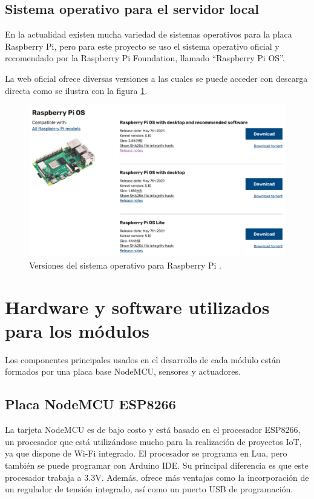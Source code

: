 \subsection{Sistema operativo para el servidor local}

En la actualidad existen mucha variedad de sistemas operativos para la placa Raspberry Pi, pero para este proyecto se uso el sistema operativo oficial y recomendado por la Raspberry Pi Foundation, llamado ``Raspberry Pi OS''.

La web oficial ofrece diversas versiones a las cuales se puede acceder con descarga directa como se ilustra con la figura \ref{fig:so}.

\begin{figure}[htbp]
	\centering
	\includegraphics[width=.95\textwidth]{./Figures/so.png}
	\caption{Versiones del sistema operativo para Raspberry Pi \protect\footnotemark.}
	\label{fig:so}
\end{figure}


\section{Hardware y software utilizados para los módulos}

Los componentes principales usados en el desarrollo de cada módulo están formados por una placa base NodeMCU, sensores y actuadores.

\subsection{Placa NodeMCU ESP8266}

La tarjeta NodeMCU es de bajo costo y está basado en el procesador ESP8266, un procesador que está utilizándose mucho para la realización de proyectos IoT, ya que dispone de Wi-Fi integrado. El procesador se programa en Lua, pero también se puede programar con Arduino IDE. Su principal diferencia es que este procesador trabaja a 3.3V.  Además, ofrece más ventajas como la incorporación de un regulador de tensión integrado, así como un puerto USB de programación. 

